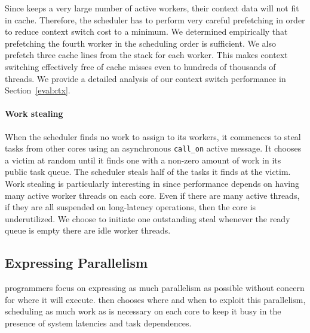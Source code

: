 Since \Grappa keeps a very large number of active workers, their context data
will not fit in cache. Therefore, the scheduler has to perform very careful
prefetching in order to reduce context switch cost to a minimum. We determined
empirically that prefetching the fourth worker in the scheduling order is
sufficient. We also prefetch three cache lines from the stack for each worker.
This makes context switching effectively free of cache misses even to hundreds
of thousands of threads. We provide a detailed analysis of our context switch
performance in Section~\ref{eval:ctx}.

\paragraph{Work stealing} 
When the scheduler finds no work to assign to its workers, it commences to
steal tasks from other cores using an asynchronous \texttt{call\_on} active
message. It chooses a victim at random until it finds one with a non-zero
amount of work in its public task queue. The scheduler steals half of the
tasks it finds at the victim. Work stealing is particularly interesting in
\Grappa since performance depends on having many active worker threads on each
core. Even if there are many active threads, if they are all suspended on
long-latency operations, then the core is underutilized. We choose to initiate
one outstanding steal whenever the ready queue is empty there are idle worker
threads.

\subsection{Expressing Parallelism}

\Grappa programmers focus on expressing as much parallelism as possible
without concern for where it will execute. \Grappa then chooses where and when
to exploit this parallelism, scheduling as much work as is necessary on each
core to keep it busy in the presence of system latencies and task dependences.

